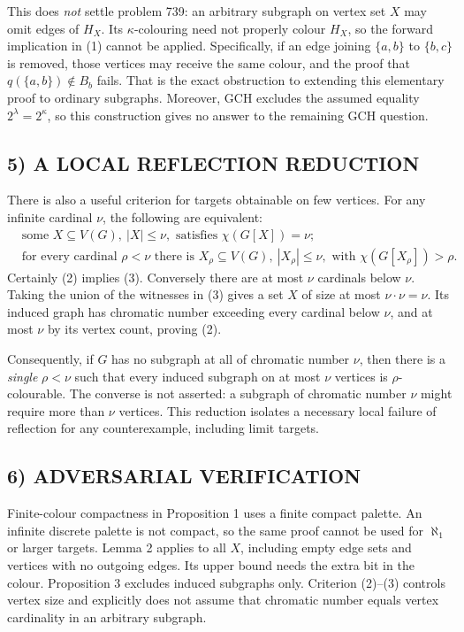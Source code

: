 This does \emph{not} settle problem 739: an arbitrary subgraph on vertex set $X$ may omit edges of $H_X$. Its $\kappa$-colouring need not properly colour $H_X$, so the forward implication in (1) cannot be applied. Specifically, if an edge joining $\{a,b\}$ to $\{b,c\}$ is removed, those vertices may receive the same colour, and the proof that $q(\{a,b\})\notin B_b$ fails. That is the exact obstruction to extending this elementary proof to ordinary subgraphs. Moreover, GCH excludes the assumed equality $2^\lambda=2^\kappa$, so this construction gives no answer to the remaining GCH question.

\subsection*{5) A LOCAL REFLECTION REDUCTION}
There is also a useful criterion for targets obtainable on few vertices. For any infinite cardinal $\nu$, the following are equivalent:
\begin{align*}
&\text{some }X\subseteq V(G),\ |X|\le\nu,\text{ satisfies }\chi(G[X])=\nu;\tag{2}\\
&\text{for every cardinal }\rho<\nu\text{ there is }X_\rho\subseteq V(G),\ |X_\rho|\le\nu,
\text{ with }\chi(G[X_\rho])>\rho.\tag{3}
\end{align*}
Certainly (2) implies (3). Conversely there are at most $\nu$ cardinals below $\nu$. Taking the union of the witnesses in (3) gives a set $X$ of size at most $\nu\cdot\nu=\nu$. Its induced graph has chromatic number exceeding every cardinal below $\nu$, and at most $\nu$ by its vertex count, proving (2).

Consequently, if $G$ has no subgraph at all of chromatic number $\nu$, then there is a \emph{single} $\rho<\nu$ such that every induced subgraph on at most $\nu$ vertices is $\rho$-colourable. The converse is not asserted: a subgraph of chromatic number $\nu$ might require more than $\nu$ vertices. This reduction isolates a necessary local failure of reflection for any counterexample, including limit targets.

\subsection*{6) ADVERSARIAL VERIFICATION}
Finite-colour compactness in Proposition 1 uses a finite compact palette. An infinite discrete palette is not compact, so the same proof cannot be used for $\aleph_1$ or larger targets. Lemma 2 applies to all $X$, including empty edge sets and vertices with no outgoing edges. Its upper bound needs the extra bit in the colour. Proposition 3 excludes induced subgraphs only. Criterion (2)--(3) controls vertex size and explicitly does not assume that chromatic number equals vertex cardinality in an arbitrary subgraph.

